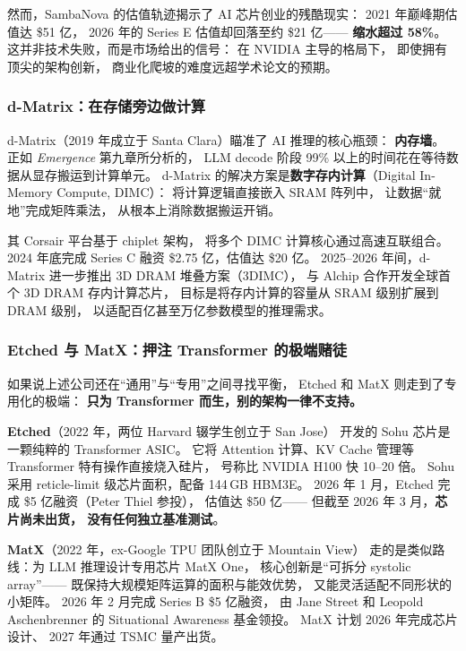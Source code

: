 然而，SambaNova 的估值轨迹揭示了 AI 芯片创业的残酷现实：
2021 年巅峰期估值达 \$51 亿，
2026 年的 Series E 估值却回落至约 \$21 亿——
\textbf{缩水超过 58\%}。
这并非技术失败，而是市场给出的信号：
在 NVIDIA 主导的格局下，
即使拥有顶尖的架构创新，
商业化爬坡的难度远超学术论文的预期。

\subsubsection{d-Matrix：在存储旁边做计算}

d-Matrix（2019 年成立于 Santa Clara）瞄准了 AI 推理的核心瓶颈：
\textbf{内存墙}。
正如 \textit{Emergence} 第九章所分析的，
LLM decode 阶段 99\% 以上的时间花在等待数据从显存搬运到计算单元。
d-Matrix 的解决方案是\textbf{数字存内计算}（Digital In-Memory Compute, DIMC）：
将计算逻辑直接嵌入 SRAM 阵列中，
让数据``就地''完成矩阵乘法，
从根本上消除数据搬运开销。

其 Corsair 平台基于 chiplet 架构，
将多个 DIMC 计算核心通过高速互联组合。
2024 年底完成 Series C 融资 \$2.75 亿，估值达 \$20 亿。
2025--2026 年间，d-Matrix 进一步推出 3D DRAM 堆叠方案（3DIMC），
与 Alchip 合作开发全球首个 3D DRAM 存内计算芯片，
目标是将存内计算的容量从 SRAM 级别扩展到 DRAM 级别，
以适配百亿甚至万亿参数模型的推理需求。

\subsubsection{Etched 与 MatX：押注 Transformer 的极端赌徒}

如果说上述公司还在``通用''与``专用''之间寻找平衡，
Etched 和 MatX 则走到了专用化的极端：
\textbf{只为 Transformer 而生，别的架构一律不支持。}

\textbf{Etched}（2022 年，两位 Harvard 辍学生创立于 San Jose）
开发的 Sohu 芯片是一颗纯粹的 Transformer ASIC。
它将 Attention 计算、KV Cache 管理等
Transformer 特有操作直接烧入硅片，
号称比 NVIDIA H100 快 10--20 倍。
Sohu 采用 reticle-limit 级芯片面积，配备 144\,GB HBM3E。
2026 年 1 月，Etched 完成 \$5 亿融资（Peter Thiel 参投），
估值达 \$50 亿——
但截至 2026 年 3 月，\textbf{芯片尚未出货，
没有任何独立基准测试}。

\textbf{MatX}（2022 年，ex-Google TPU 团队创立于 Mountain View）
走的是类似路线：为 LLM 推理设计专用芯片 MatX One，
核心创新是``可拆分 systolic array''——
既保持大规模矩阵运算的面积与能效优势，
又能灵活适配不同形状的小矩阵。
2026 年 2 月完成 Series B \$5 亿融资，
由 Jane Street 和 Leopold Aschenbrenner 的
Situational Awareness 基金领投。
MatX 计划 2026 年完成芯片设计、
2027 年通过 TSMC 量产出货。

